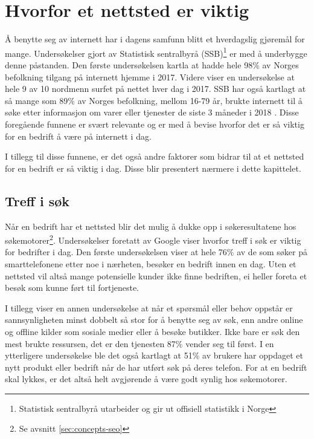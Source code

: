 \section{Hvorfor et nettsted er viktig}
Å benytte seg av internett har i dagens samfunn blitt et hverdagslig gjøremål for mange. Undersøkelser gjort av Statistisk sentralbyrå (SSB)\footnote{Statistisk sentralbyrå utarbeider og gir ut offisiell statistikk i Norge} er med å underbygge denne påstanden. Den første undersøkelsen \cite{ssb17fim} kartla at hadde hele 98\% av Norges befolkning tilgang på internett hjemme i 2017. Videre viser en undersøkelse \cite{ssb17nat} at hele 9 av 10 nordmenn surfet på nettet hver dag i 2017. SSB har også kartlagt  at så mange som 89\% av Norges befolkning, mellom 16-79 år, brukte internett til å søke etter informasjon om varer eller tjenester de siste 3 måneder i 2018 \cite{ssb18aup}. Disse foregående funnene er svært relevante og er med å bevise hvorfor det er så viktig for en bedrift å være på internett i dag.

I tillegg til disse funnene, er det også andre faktorer som bidrar til at et nettsted for en bedrift er så viktig i dag. Disse blir presentert nærmere i dette kapittelet. 

\subsection{Treff i søk}
\label{sec:search-results}
Når en bedrift har et nettsted blir det mulig å dukke opp i søkeresultatene hos søkemotorer\footnote{Se avsnitt \ref{sec:concepts-seo}}. Undersøkelser foretatt av Google viser hvorfor treff i søk er viktig for bedrifter i dag. Den første undersøkelsen \cite{google16hms} viser at hele 76\% av de som søker på smarttelefonene etter noe i nærheten, besøker en bedrift innen en dag. Uten et nettsted vil altså mange potensielle kunder ikke finne bedriften, ei heller foreta et besøk som kunne ført til fortjeneste. 

I tillegg viser en annen undersøkelse \cite{google16mhc} at når et spørsmål eller behov oppstår er sannsynligheten minst dobbelt så stor for å benytte seg av søk, enn andre online og offline kilder som sosiale medier eller å besøke butikker. Ikke bare er søk den mest brukte ressursen, det er den tjenesten 87\% vender seg til først. I en ytterligere undersøkelse  \cite{google16scp} ble det også kartlagt at 51\% av brukere har oppdaget et nytt produkt eller bedrift når de har utført søk på deres telefon. For at en bedrift skal lykkes, er det altså helt avgjørende å være godt synlig hos søkemotorer.


